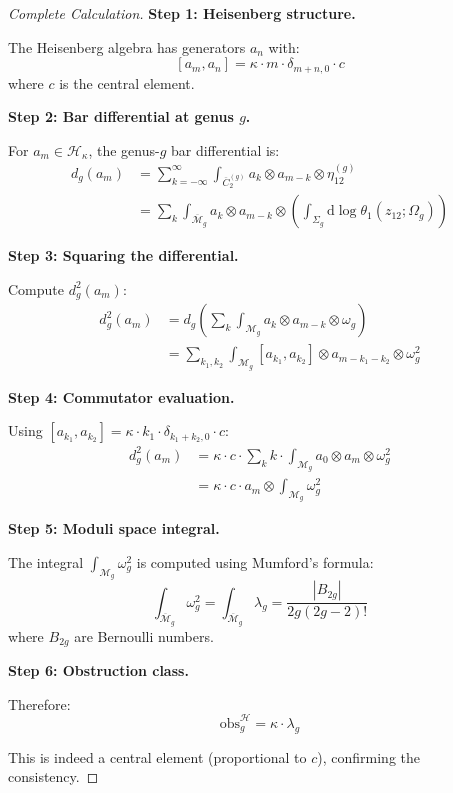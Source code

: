 \begin{proof}[Complete Calculation]

\textbf{Step 1: Heisenberg structure.}

The Heisenberg algebra has generators $a_n$ with:
$$[a_m, a_n] = \kappa \cdot m \cdot \delta_{m+n,0} \cdot c$$
where $c$ is the central element.

\textbf{Step 2: Bar differential at genus $g$.}

For $a_m \in \mathcal{H}_\kappa$, the genus-$g$ bar differential is:
\begin{align}
d_g(a_m) &= \sum_{k=-\infty}^{\infty} \int_{\overline{C}_2^{(g)}} a_k \otimes a_{m-k} 
\otimes \eta_{12}^{(g)} \\
&= \sum_{k} \int_{\overline{\mathcal{M}}_g} a_k \otimes a_{m-k} \otimes 
\left(\int_{\Sigma_g} \text{d}\log\theta_1(z_{12}; \Omega_g)\right)
\end{align}

\textbf{Step 3: Squaring the differential.}

Compute $d_g^2(a_m)$:
\begin{align}
d_g^2(a_m) &= d_g\left(\sum_k \int_{\mathcal{M}_g} a_k \otimes a_{m-k} \otimes \omega_g\right) \\
&= \sum_{k_1, k_2} \int_{\mathcal{M}_g} [a_{k_1}, a_{k_2}] \otimes a_{m-k_1-k_2} 
\otimes \omega_g^2
\end{align}

\textbf{Step 4: Commutator evaluation.}

Using $[a_{k_1}, a_{k_2}] = \kappa \cdot k_1 \cdot \delta_{k_1 + k_2, 0} \cdot c$:
\begin{align}
d_g^2(a_m) &= \kappa \cdot c \cdot \sum_{k} k \cdot \int_{\mathcal{M}_g} 
a_0 \otimes a_m \otimes \omega_g^2 \\
&= \kappa \cdot c \cdot a_m \otimes \int_{\mathcal{M}_g} \omega_g^2
\end{align}

\textbf{Step 5: Moduli space integral.}

The integral $\int_{\mathcal{M}_g} \omega_g^2$ is computed using Mumford's formula:
\begin{equation}
\int_{\overline{\mathcal{M}}_g} \omega_g^2 = \int_{\overline{\mathcal{M}}_g} \lambda_g 
= \frac{|B_{2g}|}{2g(2g-2)!}
\end{equation}
where $B_{2g}$ are Bernoulli numbers.

\textbf{Step 6: Obstruction class.}

Therefore:
$$\text{obs}_g^{\mathcal{H}} = \kappa \cdot \lambda_g$$

This is indeed a central element (proportional to $c$), confirming the consistency.
\end{proof}

